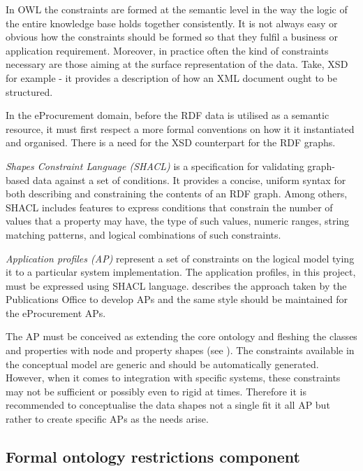 	In OWL the constraints are formed at the semantic level in the way the logic of the entire knowledge base holds together consistently. It is not always easy or obvious how the constraints should be formed so that they fulfil a business or application requirement. Moreover, in practice often the kind of constraints necessary are those aiming at the surface representation of the data. Take, XSD for example - it provides a description of how an XML document ought to be structured.
	
	In the eProcurement domain, before the RDF data is utilised as a semantic resource, it must first respect a more formal conventions on how it it instantiated and organised. There is a need for the XSD counterpart for the RDF graphs. 
	
	\textit{Shapes Constraint Language (SHACL)} \cite{shacl-spec} is a specification for validating graph-based data against a set of conditions. It provides a concise, uniform syntax for both describing and constraining the contents of an RDF graph. Among others, SHACL includes features to express conditions that constrain the number of values that a property may have, the type of such values, numeric ranges, string matching patterns, and logical combinations of such constraints.

	\textit{Application profiles (AP)} represent a set of constraints on the logical model tying it to a particular system implementation. The application profiles, in this project, must be expressed using SHACL language. \citet{costetchi2016} describes the approach taken by the Publications Office to develop APs and the same style should be maintained for the eProcurement APs. 
	
	The AP must be conceived as extending the core ontology and fleshing the classes and properties with node and property shapes (see \cite[Sec 2.2--2.3]{shacl-spec}). The constraints available in the conceptual model are generic and should be automatically generated. However, when it comes to integration with specific systems, these constraints may not be sufficient or possibly even to rigid at times. Therefore it is recommended to conceptualise the data shapes not a single fit it all AP but rather to create specific APs as the needs arise. 
	
	\subsection{Formal ontology restrictions component}
	\label{sec:restrictions}
	
